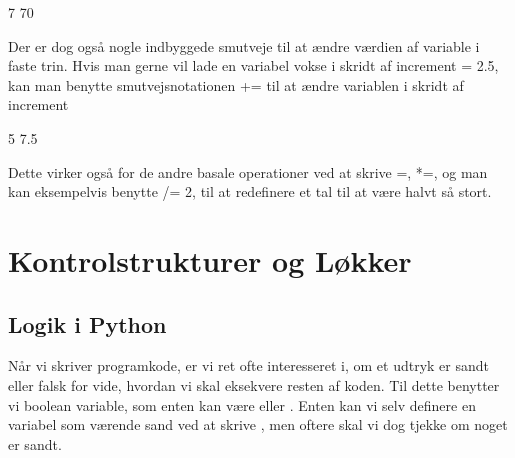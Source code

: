 \documentclass[letterpaper,10pt,english]{jupyterBook}
\begin{document}
\begin{sphinxVerbatim}[commandchars=\\\{\}]
7
70
\end{sphinxVerbatim}

Der er dog også nogle indbyggede smutveje til at ændre værdien af variable i faste trin. Hvis man gerne vil lade en variabel vokse i skridt af increment = 2.5, kan man benytte smutvejs\sphinxhyphen{}notationen += til at ændre variablen i skridt af increment

\begin{sphinxVerbatim}[commandchars=\\\{\}]
  
  

   
\end{sphinxVerbatim}

\begin{sphinxVerbatim}[commandchars=\\\{\}]
5
7.5
\end{sphinxVerbatim}

Dette virker også for de andre basale operationer ved at skrive \sphinxhyphen{}=, *=, og man kan eksempelvis benytte /= 2, til at redefinere et tal til at være halvt så stort.


\section{Kontrolstrukturer og Løkker}
\label{\detokenize{notebooks/Andet_python:kontrolstrukturer-og-lokker}}\label{\detokenize{notebooks/Andet_python::doc}}


\subsection{Logik i Python}
\label{\detokenize{notebooks/Andet_python:logik-i-python}}
Når vi skriver programkode, er vi ret ofte interesseret i, om et udtryk er sandt eller falsk for vide, hvordan vi skal eksekvere resten af koden. Til dette benytter vi boolean variable, som enten kan være  eller . Enten kan vi selv definere en variabel som værende sand ved at skrive , men oftere skal vi dog tjekke om noget er sandt.
\end{document}
